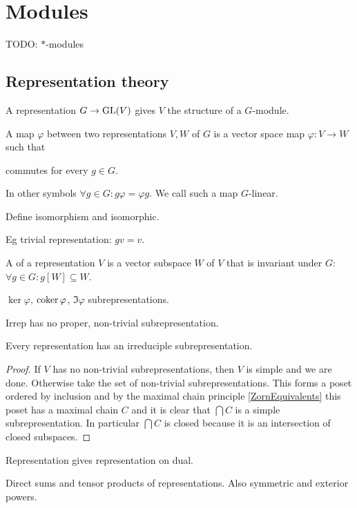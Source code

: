 \chapter{Modules}
TODO: $*$-modules
\section{Representation theory}
A representation $G\to \operatorname{GL}(V)$ gives $V$ the structure of a $G$-module.

A map $\varphi$ between two representations $V,W$ of $G$ is a vector space map $\varphi: V\to W$ such that
\begin{center}
commutes for every $g\in G$.
\end{center}
In other symbols $\forall g\in G: g\varphi = \varphi g$.
We call such a map $G$-linear.

Define isomorphism and isomorphic.

Eg trivial representation: $gv = v$.

A  of a representation $V$ is a vector subspace $W$ of $V$ that is invariant under $G$: $\forall g\in G: g[W]\subseteq W$.

$\ker \varphi$, $\operatorname{coker} \varphi$, $\Im \varphi$ subrepresentations.

Irrep has no proper, non-trivial subrepresentation.

\begin{lemma} \label{existenceIrreps}
Every representation has an irreduciple subrepresentation.
\end{lemma}
\begin{proof}
If $V$ has no non-trivial subrepresentations, then $V$ is simple and we are done. 
Otherwise take the set of non-trivial subrepresentations. This forms a poset ordered by inclusion and by the maximal chain principle \ref{ZornEquivalents} this poset has a maximal chain $C$ and it is clear that $\bigcap C$ is a simple subrepresentation. In particular $\bigcap C$ is closed because it is an intersection of closed subspaces.
\end{proof}

Representation gives representation on dual.

Direct sums and tensor products of representations. Also symmetric and exterior powers.

